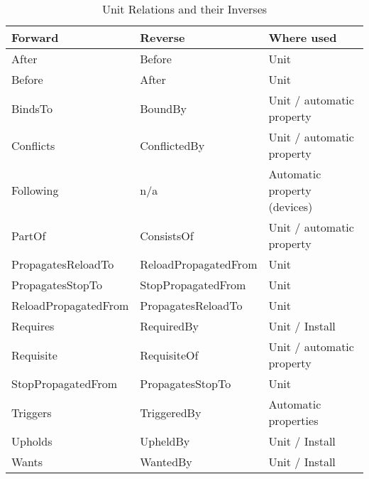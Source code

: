 \documentclass[openany, 12pt]{book}
\begin{document}
\begin{table}[ht]
  \begin{center}
    \begin{tabular}{lll}
      \toprule
      \textbf{Forward}     & \textbf{Reverse}     & \textbf{Where used}          \\
      \midrule
      After                & Before               & Unit                         \\
      Before               & After                & Unit                         \\
      BindsTo              & BoundBy              & Unit / automatic property    \\
      Conflicts            & ConflictedBy         & Unit / automatic property    \\
      Following            & n/a                  & Automatic property (devices) \\
      PartOf               & ConsistsOf           & Unit / automatic property    \\
      PropagatesReloadTo   & ReloadPropagatedFrom & Unit                         \\
      PropagatesStopTo     & StopPropagatedFrom   & Unit                         \\
      ReloadPropagatedFrom & PropagatesReloadTo   & Unit                         \\
      Requires             & RequiredBy           & Unit / Install               \\
      Requisite            & RequisiteOf          & Unit / automatic property    \\
      StopPropagatedFrom   & PropagatesStopTo     & Unit                         \\
      Triggers             & TriggeredBy          & Automatic properties         \\
      Upholds              & UpheldBy             & Unit / Install               \\
      Wants                & WantedBy             & Unit / Install               \\
      \bottomrule
    \end{tabular}
  \end{center}
  \caption{Unit Relations and their Inverses}
\end{table}

\end{document}
